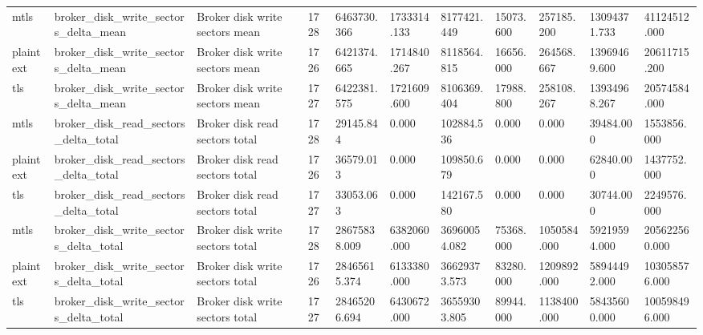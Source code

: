 \begin{longtable}{lllllllllll}
mtls & broker\_disk\_write\_sectors\_delta\_mean & Broker disk write sectors mean & 1728 & 6463730.366 & 1733314.133 & 8177421.449 & 15073.600 & 257185.200 & 13094371.733 & 41124512.000 \\
plaintext & broker\_disk\_write\_sectors\_delta\_mean & Broker disk write sectors mean & 1726 & 6421374.665 & 1714840.267 & 8118564.815 & 16656.000 & 264568.667 & 13969469.600 & 20611715.200 \\
tls & broker\_disk\_write\_sectors\_delta\_mean & Broker disk write sectors mean & 1727 & 6422381.575 & 1721609.600 & 8106369.404 & 17988.800 & 258108.267 & 13934968.267 & 20574584.000 \\
mtls & broker\_disk\_read\_sectors\_delta\_total & Broker disk read sectors total & 1728 & 29145.844 & 0.000 & 102884.536 & 0.000 & 0.000 & 39484.000 & 1553856.000 \\
plaintext & broker\_disk\_read\_sectors\_delta\_total & Broker disk read sectors total & 1726 & 36579.013 & 0.000 & 109850.679 & 0.000 & 0.000 & 62840.000 & 1437752.000 \\
tls & broker\_disk\_read\_sectors\_delta\_total & Broker disk read sectors total & 1727 & 33053.063 & 0.000 & 142167.580 & 0.000 & 0.000 & 30744.000 & 2249576.000 \\
mtls & broker\_disk\_write\_sectors\_delta\_total & Broker disk write sectors total & 1728 & 28675838.009 & 6382060.000 & 36960054.082 & 75368.000 & 1050584.000 & 59219594.000 & 205622560.000 \\
plaintext & broker\_disk\_write\_sectors\_delta\_total & Broker disk write sectors total & 1726 & 28465615.374 & 6133380.000 & 36629373.573 & 83280.000 & 1209892.000 & 58944492.000 & 103058576.000 \\
tls & broker\_disk\_write\_sectors\_delta\_total & Broker disk write sectors total & 1727 & 28465206.694 & 6430672.000 & 36559303.805 & 89944.000 & 1138400.000 & 58435600.000 & 100598496.000 \\
\hline
\end{longtable}
